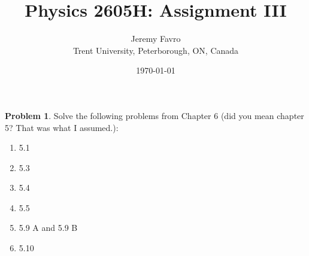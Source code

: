 \documentclass[10pt]{article}
\title{Physics 2605H: Assignment III}
\author{Jeremy Favro \\ Trent University, Peterborough, ON, Canada}
\date{\today}
\theoremstyle{definition}
\newtheorem{problem}{Problem}
\begin{document}
\maketitle

\begin{problem}
Solve the following problems from Chapter 6 (did you mean chapter 5? That was what I assumed.):
\begin{enumerate}[label=(\alph*)]
  \item 5.1
  \item 5.3
  \item 5.4
  \item 5.5
  \item 5.9 A and 5.9 B
  \item 5.10
\end{enumerate}
\end{problem}
\end{document}
